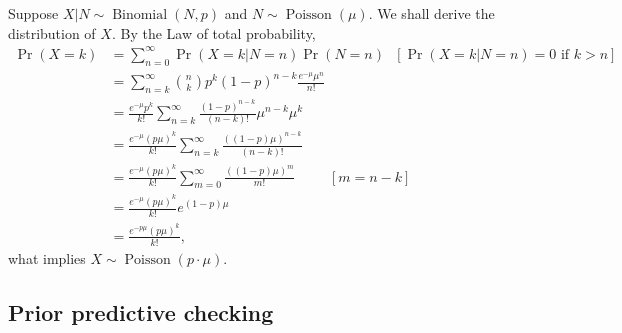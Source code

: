 \documentclass[a4paper,10pt, notitlepage]{report}
\newcommand{\pr}{\operatorname{Pr}} %
\newcommand{\Bin}{\operatorname{Binomial}}
\newcommand{\Poi}{\operatorname{Poisson}}
\begin{document}
Suppose $X|N \sim \Bin(N, p)$ and $N \sim \Poi(\mu)$. We shall derive the
distribution of $X$. By the Law of total probability, 
\begin{equation}
    \begin{split}
        \pr(X = k) &= \sum_{n=0}^{\infty} \pr(X = k|N = n)\pr(N = n) ~~~ [\pr(X = k| N = n) = 0 \text{ if } k > n] \\  
        &= \sum_{n=k}^{\infty} \binom{n}{k}p^k(1-p)^{n-k}\frac{e^{-\mu}\mu^n}{n!} \\
        &= \frac{e^{-\mu}p^k}{k!}\sum_{n=k}^{\infty} \frac{(1-p)^{n-k}}{(n-k)!}\mu^{n-k}\mu^k \\
        &= \frac{e^{-\mu}(p\mu)^k}{k!}\sum_{n=k}^{\infty} \frac{((1-p)\mu)^{n-k}}{(n-k)!} \\
        &= \frac{e^{-\mu}(p\mu)^k}{k!}\sum_{m=0}^{\infty} \frac{((1-p)\mu)^{m}}{m!} ~~~~~~~~~~~ [m = n-k] \\
        &= \frac{e^{-\mu}(p\mu)^k}{k!}e^{(1-p)\mu} \\
        &= \frac{e^{-p\mu}(p\mu)^k}{k!}, 
    \end{split}
\end{equation}
what implies $X \sim \Poi(p\cdot\mu)$.

\subsection{Prior predictive checking}
\label{sec:prior-predictive-checking}






\end{document}
